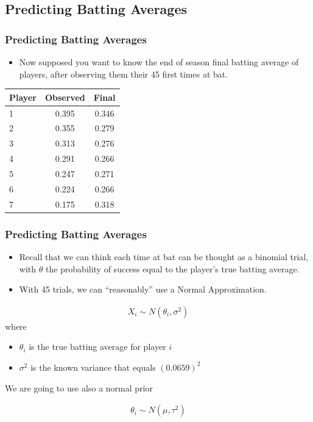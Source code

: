 \documentclass[
  shownotes,
  xcolor={svgnames},
  hyperref={colorlinks,citecolor=DarkBlue,linkcolor=DarkRed,urlcolor=DarkBlue}
  ]{beamer}
\begin{document}
\subsection{Predicting Batting Averages}
\begin{frame}[fragile]
\frametitle{Predicting Batting Averages}

\begin{itemize}
\item Now supposed you want to know the end of season final batting average of players, after observing them their 45 first times at bat.
\end{itemize}


\begin{table}[H]
\begin{tabular}{lcc}
\hline
\hline
Player & Observed & Final \\
\hline
1 & 0.395 & 0.346 \\
2 & 0.355 & 0.279 \\
3 & 0.313 & 0.276 \\
4 & 0.291 & 0.266 \\
5 & 0.247 & 0.271 \\
6 & 0.224 & 0.266 \\
7 & 0.175 & 0.318 \\
\hline
\hline
\end{tabular}
\end{table}
\end{frame}
\begin{frame}[fragile]
\frametitle{Predicting Batting Averages}

\begin{itemize}
\item Recall that we can think each time at bat can be thought as a binomial trial, with $\theta$ the probability of success equal to the player's true batting average.
\item With 45 trials, we can ``reasonably'' use a Normal Approximation.
\end{itemize}

\begin{align}
  X_i \sim N(\theta_i,\sigma^2)
\end{align}
where

\begin{itemize}
  \item $\theta_i$ is the true batting average for player $i$
  \item $\sigma^2$ is the known variance that equals $(0.0659)^2$
\end{itemize}
We are going to use also a normal prior

\begin{align}
  \theta_i \sim N(\mu,\tau^2)
\end{align}

\end{frame}
\end{document}
